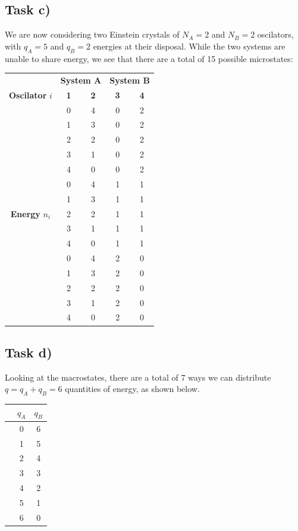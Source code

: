 \documentclass[12p,a4paper]{article}
\begin{document}
\subsection*{Task c)}
We are now considering two Einstein crystals of $N_A = 2$ and $N_B=2$ oscilators, with $q_A=5$ and $q_B = 2$ energies at their disposal. While the two systems are unable to share energy, we see that there are a total of 15 possible microstates:

\begin{tabular}{c | c c | c c}
    \multicolumn{1}{c|}{} & \multicolumn{2}{c|}{\textbf{System A}} & \multicolumn{2}{c}{\textbf{System B}} \\
    \textbf{Oscilator} $i$
                    & \textbf{1} & \textbf{2} & \textbf{3} & \textbf{4}\\
    \hline
    \multirow{15}{*}{\textbf{Energy} $n_i$}
                    & 0 & 4 & 0 & 2 \\
     				& 1 & 3 & 0 & 2 \\
     				& 2 & 2 & 0 & 2 \\
     				& 3 & 1 & 0 & 2 \\
     				& 4 & 0 & 0 & 2 \\
     				& 0 & 4 & 1 & 1 \\
     				& 1 & 3 & 1 & 1 \\
     				& 2 & 2 & 1 & 1 \\
     				& 3 & 1 & 1 & 1 \\
     				& 4 & 0 & 1 & 1 \\
     				& 0 & 4 & 2 & 0 \\
     				& 1 & 3 & 2 & 0 \\
     				& 2 & 2 & 2 & 0 \\
     				& 3 & 1 & 2 & 0 \\
     				& 4 & 0 & 2 & 0 \\
\end{tabular}


\subsection*{Task d)}
Looking at the macrostates, there are a total of 7 ways we can distribute $q = q_A + q_B = 6$ quantities of energy, as shown below.

\begin{tabular}{c | c c}
    	& $q_A$ & $q_B$ \\
    \hline
    	&  0  &  6 \\
    	&  1  &  5 \\
    	&  2  &  4 \\
    	&  3  &  3 \\
    	&  4  &  2 \\
    	&  5  &  1 \\
    	&  6  &  0 \\
\end{tabular}
\end{document}
